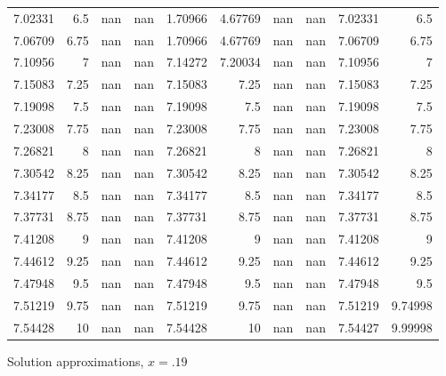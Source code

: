\documentclass[10pt,letterpaper]{article}
\begin{document}
\begin{figure}
\begin{tabular}{rrrrrrrrrr}
 7.02331   &  6.5      &  nan         &   nan        &        1.70966   &         4.67769  & nan         & nan       &    7.02331   &      6.5     \\
 7.06709   &  6.75     &  nan         &   nan        &        1.70966   &         4.67769  & nan         & nan       &    7.06709   &      6.75    \\
 7.10956   &  7        &  nan         &   nan        &        7.14272   &         7.20034  & nan         & nan       &    7.10956   &      7       \\
 7.15083   &  7.25     &  nan         &   nan        &        7.15083   &         7.25     & nan         & nan       &    7.15083   &      7.25    \\
 7.19098   &  7.5      &  nan         &   nan        &        7.19098   &         7.5      & nan         & nan       &    7.19098   &      7.5     \\
 7.23008   &  7.75     &  nan         &   nan        &        7.23008   &         7.75     & nan         & nan       &    7.23008   &      7.75    \\
 7.26821   &  8        &  nan         &   nan        &        7.26821   &         8        & nan         & nan       &    7.26821   &      8       \\
 7.30542   &  8.25     &  nan         &   nan        &        7.30542   &         8.25     & nan         & nan       &    7.30542   &      8.25    \\
 7.34177   &  8.5      &  nan         &   nan        &        7.34177   &         8.5      & nan         & nan       &    7.34177   &      8.5     \\
 7.37731   &  8.75     &  nan         &   nan        &        7.37731   &         8.75     & nan         & nan       &    7.37731   &      8.75    \\
 7.41208   &  9        &  nan         &   nan        &        7.41208   &         9        & nan         & nan       &    7.41208   &      9       \\
 7.44612   &  9.25     &  nan         &   nan        &        7.44612   &         9.25     & nan         & nan       &    7.44612   &      9.25    \\
 7.47948   &  9.5      &  nan         &   nan        &        7.47948   &         9.5      & nan         & nan       &    7.47948   &      9.5     \\
 7.51219   &  9.75     &  nan         &   nan        &        7.51219   &         9.75     & nan         & nan       &    7.51219   &      9.74998 \\
 7.54428   & 10        &  nan         &   nan        &        7.54428   &        10        & nan         & nan       &    7.54427   &      9.99998 \\
\hline
\end{tabular}
\caption{Solution approximations, $x=.19$}
\end{figure}
\end{document}

